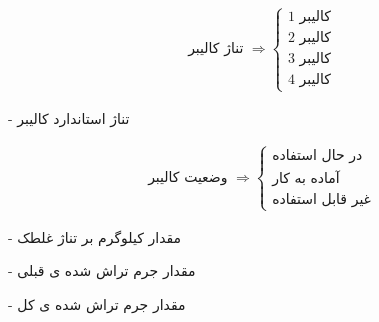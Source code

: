 \documentclass[12pt]{article}
\begin{document}
\begin{align*}
\text{ تناژ کالیبر }
\Rightarrow
\begin{cases}
\text{کالیبر 1}
\\
\text{کالیبر 2}
\\
\text{کالیبر 3}
\\
\text{کالیبر 4}
\end{cases}
\end{align*}




- تناژ استاندارد کالیبر




\begin{align*}
\text{ وضعیت کالیبر }
\Rightarrow
\begin{cases}
\text{در حال استفاده}
\\
\text{آماده به کار}
\\
\text{غیر قابل استفاده}
\end{cases}
\end{align*}




- مقدار کیلوگرم بر تناژ غلطک


- مقدار جرم تراش شده ی قبلی


- مقدار جرم تراش شده ی کل
\end{document}
